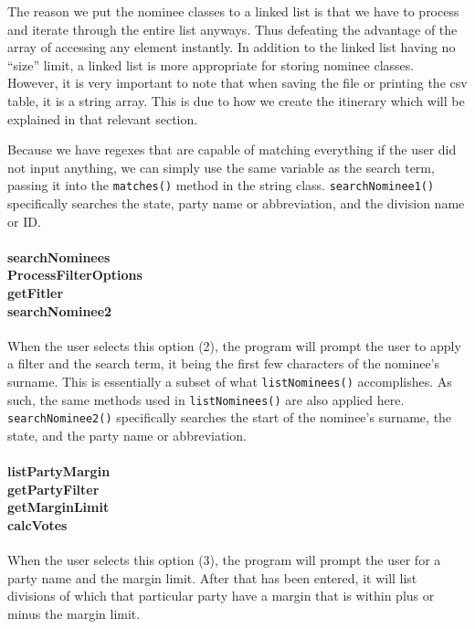 \documentclass[a4paper, 12pt, titlepage]{article}
\newcommand{\code}[1]{\small\texttt{#1}\normalsize}
\begin{document}
The reason we put the nominee classes to a linked list is that we have
to process and iterate through the entire list anyways. Thus defeating the
advantage of the array of accessing any element instantly. In addition to
the linked list having no ``size'' limit, a linked list is more appropriate
for storing nominee classes. However, it is very important to note that
when saving the file or printing the csv table, it is a string array. This
is due to how we create the itinerary which will be explained in that relevant
section.

Because we have regexes that are capable of matching everything if the user
did not input anything, we can simply use the same variable as the search
term, passing it into the \code{matches()} method in the string class.
\code{searchNominee1()} specifically searches the state, party name or
abbreviation, and the division name or ID.

\pagebreak
\paragraph{searchNominees \\
           ProcessFilterOptions \\
           getFitler \\
           searchNominee2
} \hspace{0pt}

When the user selects this option (2), the program will prompt the user
to apply a filter and the search term, it being the first few characters
of the nominee's surname. This is essentially a subset of what
\code{listNominees()} accomplishes. As such, the same methods used in
\code{listNominees()} are also applied here. \code{searchNominee2()}
specifically searches the start of the nominee's surname, the state, and the
party name or abbreviation.

\paragraph{listPartyMargin \\
           getPartyFilter \\
           getMarginLimit \\
           calcVotes
} \hspace{0pt}

When the user selects this option (3), the program will prompt the user
for a party name and the margin limit. After that has been entered, it will
list divisions of which that particular party have a margin that is within
plus or minus the margin limit.
\end{document}
